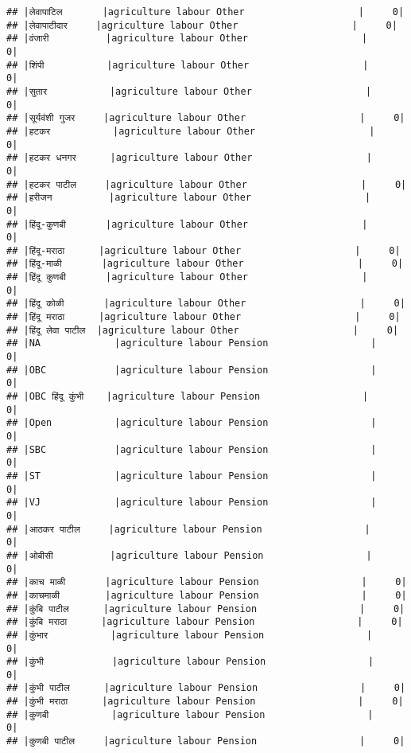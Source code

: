 \documentclass[
]{article}
\begin{document}
\begin{verbatim}
## |लेवापाटिल       |agriculture labour Other                    |     0|
## |लेवापाटीदार     |agriculture labour Other                    |     0|
## |वंजारी          |agriculture labour Other                    |     0|
## |शिंपी           |agriculture labour Other                    |     0|
## |सुतार           |agriculture labour Other                    |     0|
## |सूर्यवंशी गुजर     |agriculture labour Other                    |     0|
## |हटकर           |agriculture labour Other                    |     0|
## |हटकर धनगर      |agriculture labour Other                    |     0|
## |हटकर पाटील     |agriculture labour Other                    |     0|
## |हरीजन          |agriculture labour Other                    |     0|
## |हिंदू-कुणबी       |agriculture labour Other                    |     0|
## |हिंदू-मराठा      |agriculture labour Other                    |     0|
## |हिंदू-माळी       |agriculture labour Other                    |     0|
## |हिंदू कुणबी       |agriculture labour Other                    |     0|
## |हिंदू कोळी       |agriculture labour Other                    |     0|
## |हिंदू मराठा      |agriculture labour Other                    |     0|
## |हिंदू लेवा पाटील  |agriculture labour Other                    |     0|
## |NA             |agriculture labour Pension                  |     0|
## |OBC            |agriculture labour Pension                  |     0|
## |OBC हिंदू कुंभी    |agriculture labour Pension                  |     0|
## |Open           |agriculture labour Pension                  |     0|
## |SBC            |agriculture labour Pension                  |     0|
## |ST             |agriculture labour Pension                  |     0|
## |VJ             |agriculture labour Pension                  |     0|
## |आठकर पाटील     |agriculture labour Pension                  |     0|
## |ओबीसी          |agriculture labour Pension                  |     0|
## |काच माळी       |agriculture labour Pension                  |     0|
## |काचमाळी        |agriculture labour Pension                  |     0|
## |कुंबि पाटील      |agriculture labour Pension                  |     0|
## |कुंबि मराठा      |agriculture labour Pension                  |     0|
## |कुंभार           |agriculture labour Pension                  |     0|
## |कुंभी            |agriculture labour Pension                  |     0|
## |कुंभी पाटील      |agriculture labour Pension                  |     0|
## |कुंभी मराठा      |agriculture labour Pension                  |     0|
## |कुणबी           |agriculture labour Pension                  |     0|
## |कुणबी पाटील     |agriculture labour Pension                  |     0|

\end{verbatim}
\end{document}
